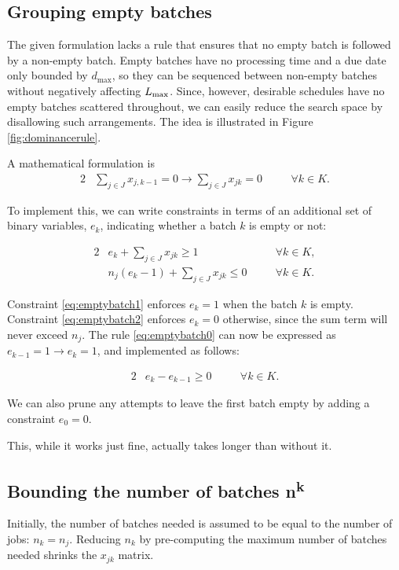 \documentclass[13pt, letterpaper, twoside]{book}
\begin{document}
\subsection{Grouping empty batches}
The given formulation lacks a rule that ensures that no empty batch is followed by a non-empty batch. Empty batches have no processing time and a due date only bounded by $d_\text{max}$, so they can be sequenced between non-empty batches without negatively affecting $L_{\text{max}}$. Since, however, desirable schedules have no empty batches scattered throughout, we can easily reduce the search space by disallowing such arrangements. The idea is illustrated in Figure \ref{fig:dominancerule}.



A mathematical formulation is
\begin{alignat}{2}
& \sum_{j \in J} x_{j,k-1} = 0 \rightarrow \sum_{j \in J} x_{jk} = 0 \quad && \forall k \in K. \label{eq:emptybatch0}
\end{alignat}

To implement this, we can write constraints in terms of an additional  set of binary variables, $e_k$, indicating whether a batch $k$ is empty or not:

\begin{alignat}{2}
& e_k + \sum_{j \in J} x_{jk} \geq 1 \quad && \forall k \in K, \label{eq:emptybatch1} \\
& n_j (e_k-1) + \sum_{j \in J} x_{jk} \leq 0 \quad && \forall k \in K. \label{eq:emptybatch2}
\end{alignat}

Constraint \ref{eq:emptybatch1} enforces $e_k = 1$ when the batch $k$ is empty. Constraint \ref{eq:emptybatch2} enforces $e_k = 0$ otherwise, since the sum term will never exceed $n_j$. The rule \ref{eq:emptybatch0} can now be expressed as $e_{k-1} = 1 \rightarrow e_k = 1$, and implemented as follows:

\begin{alignat}{2}
& e_k - e_{k-1} \geq 0 \quad && \forall k \in K.
\end{alignat}

We can also prune any attempts to leave the first batch empty by adding a constraint $e_0 = 0$.

{\color{darkred} This, while it works just fine, actually takes longer than without it.}

\subsection{Bounding the number of batches \sansitalicfont n\textsuperscript{k}}
Initially, the number of batches needed is assumed to be equal to the number of jobs: $n_k = n_j$. Reducing $n_k$ by pre-computing the maximum number of batches needed shrinks the $x_{jk}$ matrix.
\end{document}

